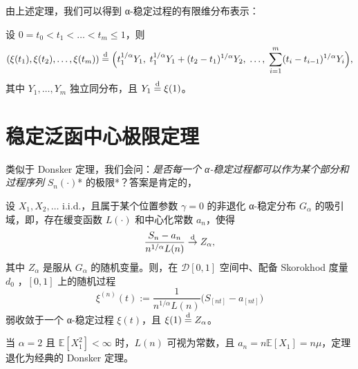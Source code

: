 由上述定理，我们可以得到 α-稳定过程的有限维分布表示：

\begin{corollary}\label{cor:ext-fclt:stable-finite-dimensional}
设 $0 = t_0 < t_1 < \dots < t_m \le 1$，则
\[(\xi(t_1), \xi(t_2), \dots, \xi(t_m)) \overset{\rm d}{=} \Bigl( t_1^{1/\alpha} Y_1,\; t_1^{1/\alpha} Y_1 + (t_2-t_1)^{1/\alpha} Y_2,\; \dots,\; \sum_{i=1}^m (t_i-t_{i-1})^{1/\alpha} Y_i \Bigr),\]
其中 $Y_1,\dots,Y_m$ 独立同分布，且 $Y_1 \overset{\rm d}{=} \xi(1)$。
\end{corollary}

\section{稳定泛函中心极限定理}

类似于 Donsker 定理，我们会问：\emph{是否每一个 α-稳定过程都可以作为某个部分和过程序列 }$S_n(\cdot)$* 的极限*？答案是肯定的，

\begin{theorem}[稳定泛函中心极限定理]
\label{thm:ext-fclt:stable-fclt}

设 $X_1, X_2, \dots$ i.i.d.，且属于某个位置参数 $\gamma=0$ 的非退化 α-稳定分布 $G_\alpha$ 的吸引域，即，存在缓变函数 $L(\cdot)$ 和中心化常数 $a_n$，使得
\[\frac{S_n - a_n}{n^{1/\alpha} L(n)} \overset{\rm d}\to Z_\alpha,\]
其中 $Z_\alpha$ 是服从 $G_\alpha$ 的随机变量。则，在 $\mathcal{D}[0,1]$ 空间中、配备 Skorokhod 度量 $d_0$ ，$[0,1]$ 上的随机过程
\[\xi^{(n)}(t) := \frac{1}{n^{1/\alpha} L(n)} \bigl( S_{[nt]} - a_{[nt]} \bigr)\]
弱收敛于一个 α-稳定过程 $\xi(t)$，且 $\xi(1) \overset{\rm d}{=} Z_\alpha$。

\end{theorem}

\begin{remark}

  当 $\alpha=2$ 且 $\mathbb{E}[X_1^2] < \infty$ 时，$L(n)$ 可视为常数，且 $a_n = n\mathbb{E}[X_1]=n\mu$，定理退化为经典的 Donsker 定理。
\end{remark}

